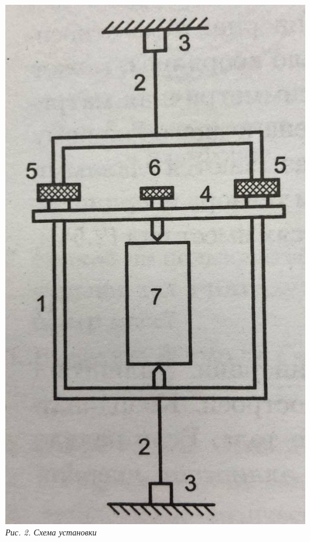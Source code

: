 \documentclass[12pt, a4paper]{article}
\begin{document}
\begin{minipage}[c]{0.32\textwidth}
	\begin{center}
		\includegraphics[scale=0.3]{Pics/picture2.jpg} \\
		\textit{\textcolor[HTML]{000000}{Рис. 2. Схема установки}}
	\end{center}
\end{minipage}
\end{document}
